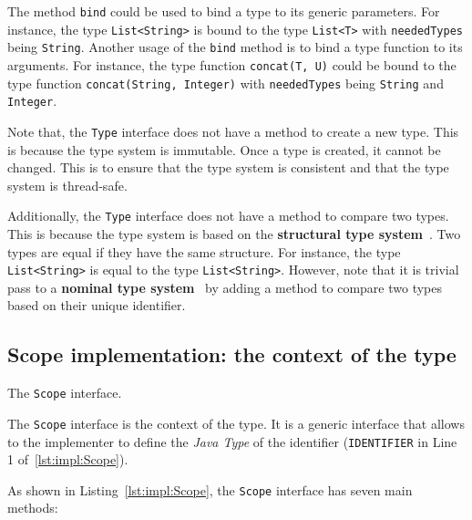 The method \texttt{bind} could be used to bind a type to its generic parameters. For instance, the type \texttt{List<String>} is bound to the type \texttt{List<T>} with \texttt{neededTypes} being \texttt{String}. Another usage of the \texttt{bind} method is to bind a type function to its arguments. For instance, the type function \texttt{concat(T, U)} could be bound to the type function \texttt{concat(String, Integer)} with \texttt{neededTypes} being \texttt{String} and \texttt{Integer}.

Note that, the \texttt{Type} interface does not have a method to create a new type. This is because the type system is immutable. Once a type is created, it cannot be changed. This is to ensure that the type system is consistent and that the type system is thread-safe.

Additionally, the \texttt{Type} interface does not have a method to compare two types. This is because the type system is based on the \textbf{structural type system}~\cite{Cardelli88, Cook89}. Two types are equal if they have the same structure. For instance, the type \texttt{List<String>} is equal to the type \texttt{List<String>}. However, note that it is trivial pass to a \textbf{nominal type system}~\cite{Pierce02} by adding a method to compare two types based on their unique identifier.

\subsection{Scope implementation: the context of the type}\label{subsec:impl:Scope}

\begin{Listing}[tbh]
    \centering
    \caption{The \texttt{Scope} interface.}
    \label{lst:impl:Scope}
\end{Listing}

The \texttt{Scope} interface is the context of the type. It is a generic interface that allows to the implementer to define the \textit{Java Type} of the identifier (\texttt{IDENTIFIER} in Line 1 of~\ref{lst:impl:Scope}).

As shown in Listing~\ref{lst:impl:Scope}, the \texttt{Scope} interface has seven main methods:


